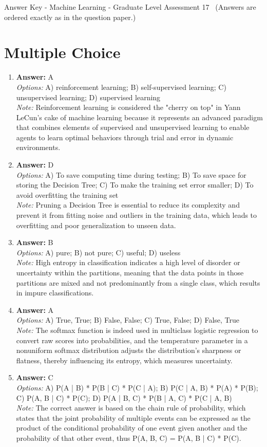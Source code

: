 \documentclass[12pt]{article}
\begin{document}
\begin{center}
Answer Key - Machine Learning - Graduate Level Assessment 17 \
\small (Answers are ordered exactly as in the question paper.)
\end{center}

\section*{Multiple Choice}
\begin{enumerate}[label=\arabic*.]
\item \textbf{Answer:} A
\\ \textit{Options:} A) reinforcement learning; B) self-supervised learning; C) unsupervised learning; D) supervised learning
\\ \textit{Note:} Reinforcement learning is considered the "cherry on top" in Yann LeCun's cake of machine learning because it represents an advanced paradigm that combines elements of supervised and unsupervised learning to enable agents to learn optimal behaviors through trial and error in dynamic environments.
\item \textbf{Answer:} D
\\ \textit{Options:} A) To save computing time during testing; B) To save space for storing the Decision Tree; C) To make the training set error smaller; D) To avoid overfitting the training set
\\ \textit{Note:} Pruning a Decision Tree is essential to reduce its complexity and prevent it from fitting noise and outliers in the training data, which leads to overfitting and poor generalization to unseen data.
\item \textbf{Answer:} B
\\ \textit{Options:} A) pure; B) not pure; C) useful; D) useless
\\ \textit{Note:} High entropy in classification indicates a high level of disorder or uncertainty within the partitions, meaning that the data points in those partitions are mixed and not predominantly from a single class, which results in impure classifications.
\item \textbf{Answer:} A
\\ \textit{Options:} A) True, True; B) False, False; C) True, False; D) False, True
\\ \textit{Note:} The softmax function is indeed used in multiclass logistic regression to convert raw scores into probabilities, and the temperature parameter in a nonuniform softmax distribution adjusts the distribution's sharpness or flatness, thereby influencing its entropy, which measures uncertainty.
\item \textbf{Answer:} C
\\ \textit{Options:} A) P(A | B) * P(B | C) * P(C | A); B) P(C | A, B) * P(A) * P(B); C) P(A, B | C) * P(C); D) P(A | B, C) * P(B | A, C) * P(C | A, B)
\\ \textit{Note:} The correct answer is based on the chain rule of probability, which states that the joint probability of multiple events can be expressed as the product of the conditional probability of one event given another and the probability of that other event, thus P(A, B, C) = P(A, B | C) * P(C).
\end{enumerate}
\end{document}
